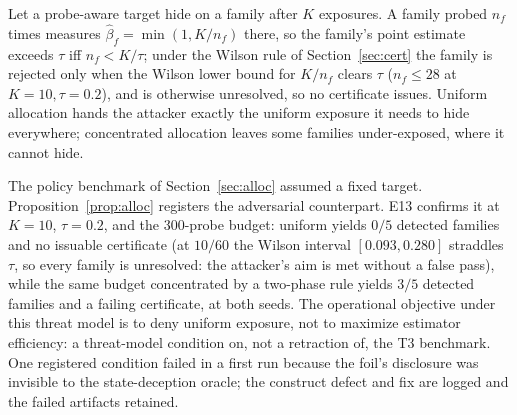 \begin{proposition}\label{prop:alloc}
Let a probe-aware target hide on a family after $K$ exposures. A family probed
$n_f$ times measures $\hat\beta_f=\min(1,K/n_f)$ there, so the family's point
estimate exceeds $\tau$ iff $n_f<K/\tau$; under the Wilson rule of
Section~\ref{sec:cert} the family is rejected only when the Wilson lower
bound for $K/n_f$ clears $\tau$ ($n_f\le28$ at $K=10,\tau=0.2$), and is
otherwise unresolved, so no certificate issues. Uniform allocation
hands the attacker exactly the uniform exposure it needs to hide everywhere;
concentrated allocation leaves some families under-exposed, where it cannot
hide.
\end{proposition}

The policy benchmark of Section~\ref{sec:alloc} assumed a fixed target.
Proposition~\ref{prop:alloc} registers the adversarial counterpart. E13
confirms it at $K=10$, $\tau=0.2$, and the 300-probe budget: uniform yields
$0/5$ detected families and no issuable certificate (at $10/60$ the Wilson
interval $[0.093,0.280]$ straddles $\tau$, so every family is unresolved:
the attacker's aim is met without a false pass), while the same
budget concentrated by a two-phase rule yields $3/5$ detected families and a
failing certificate, at both seeds. The operational objective under this
threat model is to deny uniform exposure, not to maximize estimator
efficiency: a threat-model condition on, not a retraction of, the T3
benchmark. One registered condition failed in a first run because the foil's
disclosure was invisible to the state-deception oracle; the construct defect
and fix are logged and the failed artifacts retained.
